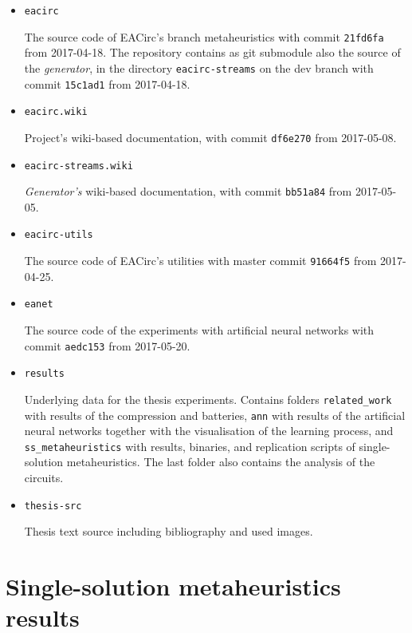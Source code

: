 \documentclass[
    digital,    %
    oneside,    %
    color,
    11pt,
    nocover,
    notable,
    nolof,
    nolot,
]{fithesis3}
\begin{document}
\begin{itemize}
    \item \texttt{eacirc}
    
    The source code of EACirc's branch metaheuristics with commit \texttt{21fd6fa} from 2017-04-18. The repository contains as git submodule also the source of the \textit{generator}, in the directory \texttt{eacirc-streams} on the dev branch with commit \texttt{15c1ad1} from 2017-04-18.
    \item \texttt{eacirc.wiki}
    
    Project's wiki-based documentation, with commit \texttt{df6e270} from 2017-05-08.
    \item \texttt{eacirc-streams.wiki}
    
    \textit{Generator's} wiki-based documentation, with commit \texttt{bb51a84} from 2017-05-05.
    \item \texttt{eacirc-utils}
    
    The source code of EACirc's utilities with master commit \texttt{91664f5} from 2017-04-25.
    \item \texttt{eanet}
    
    The source code of the experiments with artificial neural networks with commit \texttt{aedc153} from 2017-05-20.
    \item \texttt{results}
    
    Underlying data for the thesis experiments. Contains folders \texttt{related\_work} with results of the compression and batteries, \texttt{ann} with results of the artificial neural networks together with the visualisation of the learning process, and \texttt{ss\_metaheuristics} with results, binaries, and replication scripts of single-solution metaheuristics. The last folder also contains the analysis of the circuits.
    \item \texttt{thesis-src}
    
    Thesis text source including bibliography and used images.
\end{itemize}

\chapter{Single-solution metaheuristics results}
\label{chap:app-ss-res}
\end{document}

